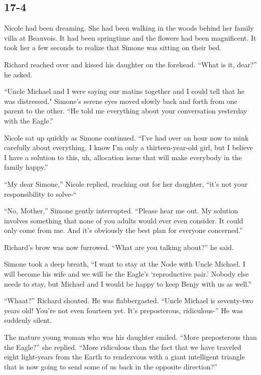 \documentclass[]{article}
\begin{document}
{\subsection*{17-4}

Nicole had been dreaming.  She had been walking in the woods behind her family villa at Beauvois.  It had been springtime and the flowers had been magnificent.  It took her a few seconds to realize that Simone was sitting on their bed.

Richard reached over and kissed his daughter on the forehead.  “What is it, dear?” he asked.

“Uncle Michael and I were saying our matins together and I could tell that he was distressed."  Simone’s serene eyes moved slowly back and forth from one parent to the other.  “He told me everything about your conversation yesterday with the Eagle.”

Nicole sat up quickly as Simone continued.  “I’ve had over an hour now to mink carefully about everything.  I know I’m only a thirteen-year-old girl, but I believe I have a solution to this, uh, allocation issue that will make everybody in the family happy.”

“My dear Simone,” Nicole replied, reaching out for her daughter, “it’s not your responsibility to solve-“

“No, Mother,” Simone gently interrupted.  “Please hear me out.  My solution involves something that none of you adults would ever even consider.  It could only come from me.  And it’s obviously the best plan for everyone concerned.”

Richard’s brow was now furrowed.  “What are you talking about?” he said.

Simone took a deep breath, “I want to stay at the Node with Uncle Michael.  I will become his wife and we will be the Eagle’s ‘reproductive pair.’ Nobody else needs to stay, but Michael and I would be happy to keep Benjy with us as well.”

“Whaat?” Richard shouted.  He was flabbergasted.  “Uncle Michael is seventy-two years old! You’re not even fourteen yet.  It’s preposterous, ridiculous-” He was suddenly silent.

The mature young woman who was his daughter smiled.  “More preposterous than the Eagle?” she replied.  “More ridiculous than the fact that we have traveled eight light-years from the Earth to rendezvous with a giant intelligent triangle that is now going to send some of us back in the opposite direction?”

}
\end{document}
